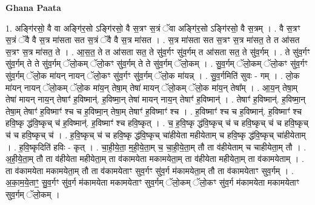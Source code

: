 \documentclass[17pt]{extarticle}
\begin{document}
\textbf{Ghana Paata } \newline

1. अङ्गि॑रसो॒ वै वा अङ्गि॑र॒सो ऽङ्गि॑रसो॒ वै स॒त्रꣳ स॒त्रं ॅवा अङ्गि॑र॒सो ऽङ्गि॑रसो॒ वै स॒त्रम् । . वै स॒त्रꣳ स॒त्रं ॅवै वै स॒त्र मा॑सता सत स॒त्रं ॅवै वै स॒त्र मा॑सत । . स॒त्र मा॑सता सत स॒त्रꣳ स॒त्र मा॑सत॒ ते त आ॑सत स॒त्रꣳ स॒त्र मा॑सत॒ ते । . आ॒स॒त॒ ते त आ॑सता सत॒ ते सु॑व॒र्गꣳ सु॑व॒र्गम् त आ॑सता सत॒ ते सु॑व॒र्गम् । . ते सु॑व॒र्गꣳ सु॑व॒र्गम् ते ते सु॑व॒र्गम् ॅलो॒कम् ॅलो॒कꣳ सु॑व॒र्गम् ते ते सु॑व॒र्गम् ॅलो॒कम् । . सु॒व॒र्गम् ॅलो॒कम् ॅलो॒कꣳ सु॑व॒र्गꣳ सु॑व॒र्गम् ॅलो॒क मा॑यन् नायन् ॅलो॒कꣳ सु॑व॒र्गꣳ सु॑व॒र्गम् ॅलो॒क मा॑यन्न् । . सु॒व॒र्गमिति॑ सुवः - गम् । . लो॒क मा॑यन् नायन् ॅलो॒कम् ॅलो॒क मा॑य॒न् तेषा॒म् तेषा॑ मायन् ॅलो॒कम् ॅलो॒क मा॑य॒न् तेषा᳚म् । . आ॒य॒न् तेषा॒म् तेषा॑ मायन् नाय॒न् तेषाꣳ॑ ह॒विष्मान्॑. ह॒विष्मा॒न् तेषा॑ मायन् नाय॒न् तेषाꣳ॑ ह॒विष्मान्॑ । . तेषाꣳ॑ ह॒विष्मान्॑. ह॒विष्मा॒न् तेषा॒म् तेषाꣳ॑ ह॒विष्माꣳ॑ श्च च ह॒विष्मा॒न् तेषा॒म् तेषाꣳ॑ ह॒विष्माꣳ॑ श्च । . ह॒विष्माꣳ॑ श्च च ह॒विष्मान्॑. ह॒विष्माꣳ॑ श्च हवि॒ष्कृ द्ध॑वि॒ष्कृच् च॑ ह॒विष्मान्॑. ह॒विष्माꣳ॑
श्च हवि॒ष्कृत् । . च॒ ह॒वि॒ष्कृ द्ध॑वि॒ष्कृच् च॑ च हवि॒ष्कृच् च॑ च हवि॒ष्कृच् च॑ च हवि॒ष्कृच् च॑ । . ह॒वि॒ष्कृच् च॑ च हवि॒ष्कृ द्ध॑वि॒ष्कृच् चा॑हीयेता महीयेताम् च हवि॒ष्कृ द्ध॑वि॒ष्कृच् चा॑हीयेताम् । . ह॒वि॒ष्कृदिति॑ हविः - कृत् । . चा॒ही॒ये॒ता॒ म॒ही॒ये॒ता॒म् च॒ चा॒ही॒ये॒ता॒म् तौ ता व॑हीयेताम् च चाहीयेता॒म् तौ । . अ॒ही॒ये॒ता॒म् तौ ता व॑हीयेता महीयेता॒म् ता व॑कामयेता मकामयेता॒म् ता व॑हीयेता महीयेता॒म् ता व॑कामयेताम् । . ता व॑कामयेता मकामयेता॒म् तौ ता व॑कामयेताꣳ सुव॒र्गꣳ सु॑व॒र्ग म॑कामयेता॒म् तौ ता व॑कामयेताꣳ सुव॒र्गम् । . अ॒का॒म॒ये॒ताꣳ॒॒ सु॒व॒र्गꣳ सु॑व॒र्ग म॑कामयेता मकामयेताꣳ सुव॒र्गम् ॅलो॒कम् ॅलो॒कꣳ सु॑व॒र्ग म॑कामयेता मकामयेताꣳ सुव॒र्गम् ॅलो॒कम् । \newline
\end{document}
